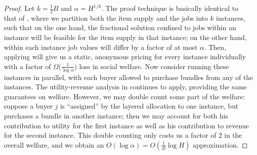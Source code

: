 \begin{proof}
  Let $k=\frac 12 B$ and $\alpha=H^{1/k}$.  The proof technique is
  basically identical to that of , where we
  partition both the item supply and the jobs into $k$ instances, such
  that on the one hand, the fractional solution confined to jobs
  within an instance will be feasible for the item supply in that
  instance; on the other hand, within each instance job values will
  differ by a factor of at most $\alpha$.  Then, applying
   will give us a static, anonymous pricing for
  every instance individually with a factor of
  $\Omega\big(\frac{1}{\log \alpha}\big)$ loss in social welfare. Now
  consider running these instances in parallel, with each buyer
  allowed to purchase bundles from any of the instances. The
  utility-revenue analysis in  continues
  to apply, providing the same guarantees on welfare. However, we may
  double count some part of the welfare: suppose a buyer $j$ is
  ``assigned'' by the layered allocation to one instance, but
  purchases a bundle in another instance; then we may account for both
  his contribution to utility for the first instance as well as his
  contribution to revenue for the second instance. This double
  counting only costs us a factor of $2$ in the overall welfare, and
  we obtain an $O(\log\alpha)=O\left(\frac{1}{B}\log H\right)$
  approximation.
\end{proof}